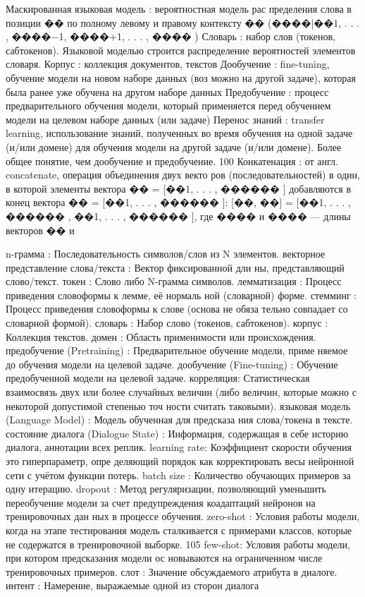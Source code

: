 Маскированная языковая модель : вероятностная модель рас
пределения слова в позиции �� по полному левому и правому контексту
�� (����|��1, . . . , ����−1, ����+1, . . . , ���� )
Словарь : набор слов (токенов, сабтокенов). Языковой моделью строится
распределение вероятностей элементов словаря.
Корпус : коллекция документов, текстов
Дообучение : fine-tuning, обучение модели на новом наборе данных (воз
можно на другой задаче), которая была ранее уже обучена на другом наборе
данных
Предобучение : процесс предварительного обучения модели, который
применяется перед обучением модели на целевом наборе данных (или задаче)
Перенос знаний : transfer learning, использование знаний, полученных во
время обучения на одной задаче (и/или домене) для обучения модели на другой
задаче (и/или домене). Более общее понятие, чем дообучение и предобучение.
100
Конкатенация : от англ. concatenate, операция объединения двух векто
ров (последовательностей) в один, в которой элементы вектора �� = [��1, . . . , ������ ]
добавляются в конец вектора �� = [��1, . . . , ������ ]:
[��, ��] = [��1, . . . , ������ , ��1, . . . , ������ ],
где ���� и ���� — длины векторов �� и 


n-грамма : Последовательность символов/слов из N элементов.
векторное представление слова/текста : Вектор фиксированной дли
ны, представляющий слово/текст.
токен : Слово либо N-грамма символов.
лемматизация : Процесс приведения словоформы к лемме, её нормаль
ной (словарной) форме.
стемминг : Процесс приведения словоформы к слове (основа не обяза
тельно совпадает со словарной формой).
словарь : Набор слово (токенов, сабтокенов).
корпус : Коллекция текстов.
домен : Область применимости или происхождения.
предобучение (Pretraining) : Предварительное обучение модели, приме
няемое до обучения модели на целевой задаче.
дообучение (Fine-tuning) : Обучение предобученной модели на целевой
задаче.
корреляция: Статистическая взаимосвязь двух или более случайных
величин (либо величин, которые можно с некоторой допустимой степенью точ
ности считать таковыми).
языковая модель (Language Model) : Модель обученная для предсказа
ния слова/токена в тексте.
состояние диалога (Dialogue State) : Информация, содержащая в себе
историю диалога, аннотации всех реплик.
learning rate: Коэффициент скорости обучения это гиперпараметр, опре
деляющий порядок как корректировать весы нейронной сети с учётом функции
потерь.
batch size : Количество обучающих примеров за одну итерацию.
dropout : Метод регуляризации, позволяющий уменьшить переобучение
модели за счет предупреждения коадаптаций нейронов на тренировочных дан
ных в процессе обучения.
zero-shot : Условия работы модели, когда на этапе тестирования модель
сталкивается с примерами классов, которые не содержатся в тренировочной
выборке.
105
few-shot: Условия работы модели, при котором предсказания модели ос
новываются на ограниченном числе тренировочных примеров.
слот : Значение обсуждаемого атрибута в диалоге.
интент : Намерение, выражаемые одной из сторон диалога
\fi